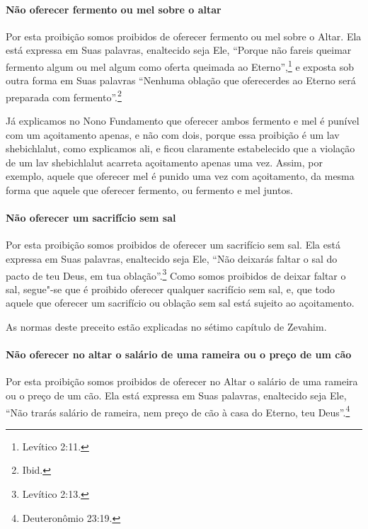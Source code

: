 \begin{multicols}{2}
\paragraph{Não oferecer fermento ou mel sobre o altar}

Por esta proibição somos proibidos de oferecer fermento ou mel sobre o
Altar. Ela está expressa em Suas palavras, enaltecido seja Ele, ``Porque
não fareis queimar fermento algum ou mel algum como oferta queimada ao
Eterno'',\footnote{Levítico 2:11.} e exposta sob outra forma em Suas palavras
``Nenhuma oblação que oferecerdes ao Eterno será preparada com
fermento''.\footnote{Ibid.}

Já explicamos no Nono Fundamento que oferecer ambos fermento e mel é
punível com um açoitamento apenas, e não com dois, porque essa
proibição é um lav shebichlalut\starr, como explicamos ali, e ficou
claramente estabelecido que a violação de um lav shebichlalut\starr{}
acarreta açoitamento apenas uma vez. Assim, por exemplo, aquele que
oferecer mel é punido uma vez com açoitamento, da mesma forma que aquele
que oferecer fermento, ou fermento e mel juntos.

\paragraph{Não oferecer um sacrifício sem sal}

Por esta proibição somos proibidos de oferecer um sacrifício sem sal.
Ela está expressa em Suas palavras, enaltecido seja Ele, ``Não deixarás
faltar o sal do pacto de teu Deus, em tua oblação''.\footnote{Levítico 2:13.}
Como somos proibidos de deixar faltar o sal, segue"-se que é proibido
oferecer qualquer sacrifício sem sal, e, que todo aquele que oferecer um
sacrifício ou oblação sem sal está sujeito ao açoitamento.

As normas deste preceito estão explicadas no sétimo capítulo de Zevahim\starr.

\paragraph{Não oferecer no altar o salário de uma rameira ou o preço de um cão}

Por esta proibição somos proibidos de oferecer no Altar o salário de uma
rameira ou o preço de um cão. Ela está expressa em Suas palavras,
enaltecido seja Ele, ``Não trarás salário de rameira, nem preço de cão
à casa do Eterno, teu Deus''.\footnote{Deuteronômio 23:19.}


\end{multicols}
